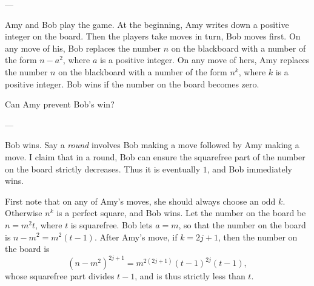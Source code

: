 
---

Amy and Bob play the game. At the beginning, Amy writes down a positive integer on the board. Then the players take moves in turn, Bob moves first. On any move of his, Bob replaces the number $n$ on the blackboard with a number of the form $n-a^2$, where $a$ is a positive integer. On any move of hers, Amy replaces the number $n$ on the blackboard with a number of the form $n^k$, where $k$ is a positive integer. Bob wins if the number on the board becomes zero.

Can Amy prevent Bob’s win?

---

Bob wins. Say a \emph{round} involves Bob making a move followed by Amy making a move. I claim that in a round, Bob can ensure the squarefree part of the number on the board strictly decreases. Thus it is eventually $1$, and Bob immediately wins.

First note that on any of Amy's moves, she should always choose an odd $k$. Otherwise $n^k$ is a perfect square, and Bob wins. Let the number on the board be $n=m^2t$, where $t$ is squarefree. Bob lets $a=m$, so that the number on the board is $n-m^2=m^2(t-1)$. After Amy's move, if $k=2j+1$, then the number on the board is \[\left(n-m^2\right)^{2j+1}=m^{2(2j+1)}(t-1)^{2j}(t-1),\]
whose squarefree part divides $t-1$, and is thus strictly less than $t$.

